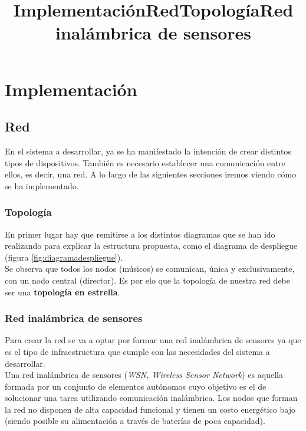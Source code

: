 \chapter{Implementación}
\title{Implementación}
\label{cap:Implementacion}


\section{Red}
\title{Red}

En el sistema a desarrollar, ya se ha manifestado la intención de crear distintos
tipos de dispositivos. También es necesario establecer una comunicación entre ellos,
es decir, una red. A lo largo de las siguientes secciones iremos viendo cómo se
ha implementado.\\

\subsection{Topología}
\title{Topología}
En primer lugar hay que remitirse a los distintos diagramas que se han ido
realizando para explicar la estructura propuesta, como el diagrama de despliegue (figura \ref{fig:diagramadespliegue}).\\

Se observa que todos los nodos (músicos) se comunican, única y exclusivamente, con un nodo central (director).
Es por elo que la topología de nuestra red debe ser una \textbf{topología en estrella}.\\

\subsection{Red inalámbrica de sensores}
\title{Red inalámbrica de sensores}

Para crear la red se va a optar por formar una red inalámbrica de sensores ya que es
el tipo de infraestructura que cumple con las necesidades del sistema a desarrollar.\\

Una red inalámbrica de sensores (\textit{WSN, Wireless Sensor Network}) es aquella formada por un
conjunto de elementos autónomos cuyo objetivo es el de solucionar una tarea utilizando
comunicación inalámbrica. Los nodos que forman la red no disponen de alta capacidad funcional
y tienen un costo energético bajo (siendo posible su alimentación a través de baterías de poca capacidad).\\


